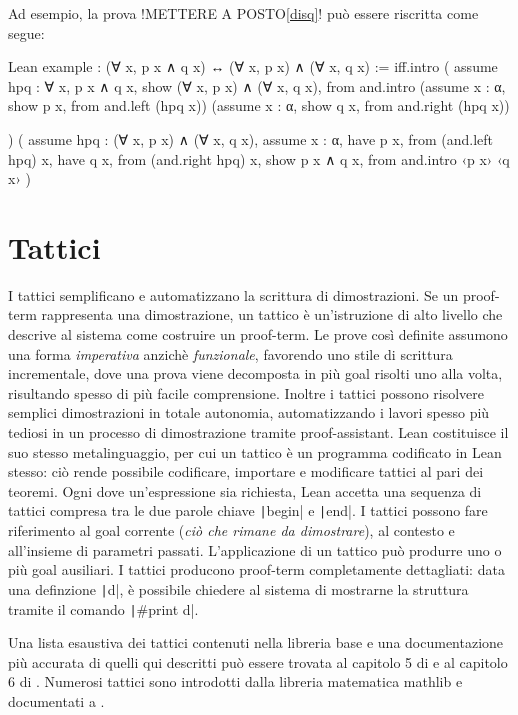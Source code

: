 Ad esempio, la prova !METTERE A POSTO\ref{disq}! può essere riscritta come segue:
\begin{code}{Lean}
example : (∀ x, p x ∧ q x) ↔ (∀ x, p x) ∧ (∀ x, q x) :=
  iff.intro
    (
      assume hpq : ∀ x, p x ∧ q x,
      show (∀ x, p x) ∧ (∀ x, q x), from
        and.intro
          (assume x : α,
           show p x, from and.left (hpq x))
          (assume x : α,
           show q x, from and.right (hpq x))

    )
    (
      assume hpq : (∀ x, p x) ∧ (∀ x, q x),
      assume x : α,
      have p x, from (and.left hpq) x,
      have q x, from (and.right hpq) x,
      show p x ∧ q x, from 
        and.intro ‹p x› ‹q x›
    )
\end{code}

\section{Tattici} \label{tact}
I tattici semplificano e automatizzano la scrittura di dimostrazioni. Se un proof-term rappresenta una dimostrazione, un tattico è un'istruzione di alto livello che descrive al sistema come costruire un proof-term. Le prove così definite assumono una forma \emph{imperativa} anzichè \emph{funzionale}, favorendo uno stile di scrittura incrementale, dove una prova viene decomposta in più goal risolti uno alla volta, risultando spesso di più facile comprensione. Inoltre i tattici possono risolvere semplici dimostrazioni in totale autonomia, automatizzando i lavori spesso più tediosi in un processo di dimostrazione tramite proof-assistant. Lean costituisce il suo stesso metalinguaggio, per cui un tattico è un programma codificato in Lean stesso: ciò rende possibile codificare, importare e modificare tattici al pari dei teoremi.
Ogni dove un'espressione sia richiesta, Lean accetta una sequenza di tattici compresa tra le due parole chiave \texttt|begin| e \texttt|end|. I tattici possono fare riferimento al goal corrente (\emph{ciò che rimane da dimostrare}), al contesto e all'insieme di parametri passati. L'applicazione di un tattico può produrre uno o più goal ausiliari.
I tattici producono proof-term completamente dettagliati: data una definzione \texttt|d|, è possibile chiedere al sistema di mostrarne la struttura tramite il comando \texttt|#print d|.

Una lista esaustiva dei tattici contenuti nella libreria base e una documentazione più accurata di quelli qui descritti può essere trovata al capitolo 5 di \cite{tpl} e al capitolo 6 di \cite{lrf}. Numerosi tattici sono introdotti dalla libreria matematica mathlib e documentati a \cite{matht}.

